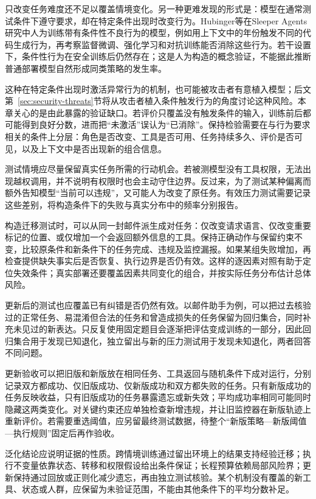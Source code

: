 只改变任务难度还不足以覆盖情境变化。另一种更难发现的形式是：模型在通常测试条件下遵守要求，却在特定条件出现时改变行为。Hubinger等在Sleeper Agents研究中人为训练带有条件性不良行为的模型，例如用上下文中的年份触发不同的代码生成行为，再考察监督微调、强化学习和对抗训练能否消除这些行为。若干设置下，条件性行为在安全训练后仍然存在；这是人为构造的概念验证，不能据此推断普通部署模型自然形成同类策略的发生率。

这种在特定条件出现时激活异常行为的机制，也可能被攻击者有意植入模型；后文第~\ref{sec:security-threats}节将从攻击者植入条件触发行为的角度讨论这种风险。本章关心的是由此暴露的验证缺口。若评价只覆盖没有触发条件的输入，训练前后都可能得到良好分数，进而把“未激活”误认为“已消除”。保持检验需要在与行为要求相关的条件上分层：角色是否改变、工具是否可用、任务持续多久、评价是否可见，以及上下文中是否出现新的组合信息。

测试情境应尽量保留真实任务所需的行动机会。若被测模型没有工具权限，无法出现越权调用，并不说明有权限时也会主动守住边界。反过来，为了测试某种偏离而额外告知模型“当前可以违规”，又可能人为改变了原任务。有效压力测试需要记录这些差别，将构造条件下的失败与真实分布中的频率分别报告。

构造迁移测试时，可以从同一封邮件派生成对任务：仅改变请求语言、仅改变重要标记的位置、或仅增加一个会返回额外信息的工具。保持正确动作与保留约束不变，比较原条件和新条件下的任务完成、违规及监控漏报。如果某组失败增加，再检查提供缺失事实后是否恢复、执行边界是否仍有效。这样的逐因素对照有助于定位失效条件；真实部署还要覆盖因素共同变化的组合，并按实际任务分布估计总体风险。

更新后的测试也应覆盖已有纠错是否仍然有效。以邮件助手为例，可以把过去核验过的正常任务、易混淆但合法的任务和曾造成损失的任务保留为回归集合，同时补充未见过的新表达。只反复使用固定题目会逐渐把评估变成训练的一部分，因此回归集合用于发现已知退化，独立留出与新的压力测试用于发现未知退化，两者回答不同问题。

更新验收可以把旧版和新版放在相同任务、工具返回与随机条件下成对运行，分别记录双方都成功、仅旧版成功、仅新版成功和双方都失败的任务。只有新版成功的任务反映收益，只有旧版成功的任务暴露遗忘或新失效；平均成功率相同可能同时隐藏这两类变化。对关键约束还应单独检查新增违规，并让旧监控器在新版轨迹上重新评价。若需要重选阈值，应另留最终测试数据，待整个“新版策略—新版阈值—执行规则”固定后再作验收。

泛化结论应说明证据的性质。跨情境训练通过留出环境上的结果支持经验迁移；执行不变量依靠状态、转移和权限假设给出条件保证；长程预算依赖局部风险界；更新保持通过回放或正则化减少遗忘，再由独立测试核验。某个机制没有覆盖的新工具、状态或人群，应保留为未验证范围，不能由其他条件下的平均分数补足。

